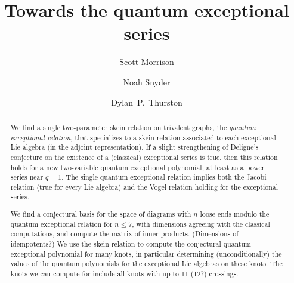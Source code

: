 \documentclass[12pt]{amsart}
\begin{document}
\title{Towards the quantum exceptional series}

\author[Morrison]{Scott Morrison}
\address{Mathematical Sciences Institute, Australian National University}

\author[Snyder]{Noah Snyder}
\address{Bloomington, Indiana, USA}

\author[Thurston]{Dylan~P.~Thurston}
\address{Bloomington, Indiana, USA}

\begin{abstract}
  We find a single two-parameter skein relation on trivalent graphs,
  the \emph{quantum exceptional relation}, that specializes to a skein
  relation associated to each exceptional Lie algebra (in the adjoint
  representation). If a slight
  strengthening of Deligne's conjecture on the existence of a
  (classical) exceptional series is true, then this relation
  holds for a new two-variable quantum exceptional polynomial, at
  least as a power series near $q=1$. The
  single quantum exceptional relation implies both the
  Jacobi relation (true for every Lie algebra) and
  the Vogel relation holding for the exceptional series.

  We find a conjectural basis for the space of diagrams with $n$ loose
  ends modulo the quantum exceptional relation for $n \le 7$, with
  dimensions agreeing with the classical computations, and compute
  the matrix of inner products. (Dimensions of idempotents?)
  We use the
  skein relation to compute the conjectural quantum exceptional
  polynomial for many knots, in particular
  determining (unconditionally) the values of the quantum polynomials
  for the exceptional Lie algebras on
  these knots. The knots we can compute for include all knots with up
  to 11 (12?) crossings.
\end{abstract}


\maketitle

\tableofcontents
\end{document}
